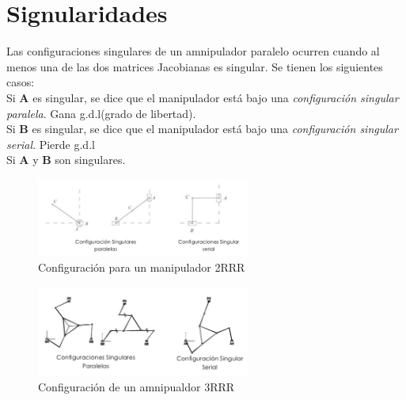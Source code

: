 \documentclass[letter,openright,12pt,spanish]{report}
\begin{document}
\section{Signularidades}

Las configuraciones singulares de un amnipulador paralelo ocurren cuando al menos una de las dos matrices Jacobianas es singular. Se tienen los siguientes casos:\\
Si \textbf{A} es singular, se dice que el manipulador est\'a bajo una \textit{configuraci\'on singular paralela}. Gana g.d.l(grado de libertad).\\
Si \textbf{B} es singular, se dice que el manipulador est\'a bajo una \textit{configuraci\'on singular serial}. Pierde g.d.l\\
Si \textbf{A} y \textbf{B} son singulares.

\begin{figure}[hbtp]
\centering
\includegraphics[width=7cm]{02.png}
\caption{Configuraci\'on para un manipulador 2RRR}
\label{Figura 2}
\end{figure}

\begin{figure}[hbtp]
\centering
\includegraphics[width=7cm]{03.png}
\caption{Configuraci\'on de un amnipualdor 3RRR}
\label{Figura 3.}
\end{figure}
\end{document}
